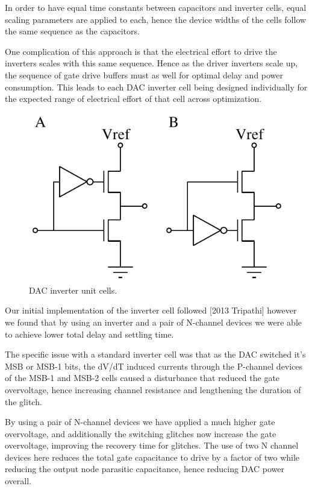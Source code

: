\documentclass[10pt,journal]{IEEEtran}\usepackage{longtable}
\begin{document}
In order to have equal time constants between capacitors and inverter cells, equal scaling parameters are applied to each, hence the device widths of the cells follow the same sequence as the capacitors.

One complication of this approach is that the electrical effort to drive the inverters scales with this same sequence. 
Hence as the driver inverters scale up, the sequence of gate drive buffers must as well for optimal delay and power consumption.
This leads to each DAC inverter cell being designed individually for the expected range of electrical effort of that cell across optimization.

\begin{figure}[tbph]
\begin{center}
\includegraphics[width=1\columnwidth]{DAC_Switch.pdf}
\caption{DAC inverter unit cells.}
\label{fig:DACUnitInverterSch}
\end{center}
\end{figure}


Our initial implementation of the inverter cell followed [2013 Tripathi] however we found that by using an inverter and a pair of N-channel devices we were able to achieve lower total delay and settling time. 

The specific issue with a standard inverter cell was that as the DAC switched it's MSB or MSB-1 bits, the dV/dT induced currents through the P-channel devices of the MSB-1 and MSB-2 cells caused a disturbance that reduced the gate overvoltage, hence increasing channel resistance and lengthening the duration of the glitch. 

By using a pair of N-channel devices we have applied a much higher gate overvoltage, and additionally the switching glitches now increase the gate overvoltage, improving the recovery time for glitches.
The use of two N channel devices here reduces the total gate capacitance to drive by a factor of two while reducing the output node parasitic capacitance, hence reducing DAC power overall.
\end{document}
